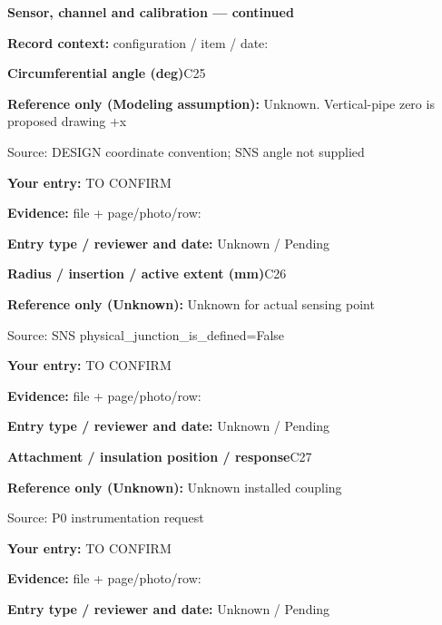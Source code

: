 \documentclass[11pt]{article}
\begin{document}
\clearpage
{\large\bfseries Sensor, channel and calibration --- continued}\par
\textbf{Record context:} configuration / item / date: \hrulefill\par
\begin{minipage}{\textwidth}\small
{\color{navy}\bfseries Circumferential angle (deg)}\hfill C25\par
\colorbox{pale}{\parbox{\dimexpr\linewidth-2\fboxsep\relax}{
\textbf{Reference only (Modeling assumption):} Unknown. Vertical-pipe zero is proposed drawing +x\par
{\footnotesize Source: DESIGN coordinate convention; SNS angle not supplied}}}\par
\textbf{Your entry:} {\color{muted}TO CONFIRM}\enspace\hrulefill\par
{\footnotesize\textbf{Evidence:} file + page/photo/row: \hrulefill\par
\textbf{Entry type / reviewer and date:} Unknown / Pending\par
}\end{minipage}\par\vspace{5pt}
\begin{minipage}{\textwidth}\small
{\color{navy}\bfseries Radius / insertion / active extent (mm)}\hfill C26\par
\colorbox{pale}{\parbox{\dimexpr\linewidth-2\fboxsep\relax}{
\textbf{Reference only (Unknown):} Unknown for actual sensing point\par
{\footnotesize Source: SNS physical\_\allowbreak{}junction\_\allowbreak{}is\_\allowbreak{}defined=False}}}\par
\textbf{Your entry:} {\color{muted}TO CONFIRM}\enspace\hrulefill\par
{\footnotesize\textbf{Evidence:} file + page/photo/row: \hrulefill\par
\textbf{Entry type / reviewer and date:} Unknown / Pending\par
}\end{minipage}\par\vspace{5pt}
\begin{minipage}{\textwidth}\small
{\color{navy}\bfseries Attachment / insulation position / response}\hfill C27\par
\colorbox{pale}{\parbox{\dimexpr\linewidth-2\fboxsep\relax}{
\textbf{Reference only (Unknown):} Unknown installed coupling\par
{\footnotesize Source: P0 instrumentation request}}}\par
\textbf{Your entry:} {\color{muted}TO CONFIRM}\enspace\hrulefill\par
{\footnotesize\textbf{Evidence:} file + page/photo/row: \hrulefill\par
\textbf{Entry type / reviewer and date:} Unknown / Pending\par
}\end{minipage}\par\vspace{5pt}
\end{document}
